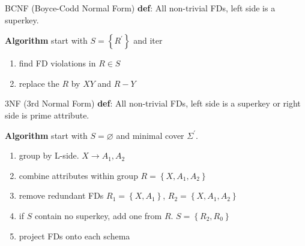 \documentclass[a4paper]{article}
\begin{document}
\begin{cheatsheetblock}{BCNF (Boyce-Codd Normal Form)}
    \textbf{def}: All non-trivial FDs, left side is a superkey.

    \textbf{Algorithm} start with $S = \left\{R^\prime\right\}$ and iter
    \begin{enumerate}
        \item find FD violations in $R \in S$
        \item replace the $R$ by $XY$ and $R-Y$
    \end{enumerate}
\end{cheatsheetblock}

\begin{cheatsheetblock}{3NF (3rd Normal Form)}
    \textbf{def}: All non-trivial FDs, left side is a superkey or right side is prime attribute.

    \textbf{Algorithm} start with $S = \varnothing$ and minimal cover $\Sigma^\prime$.
    \begin{enumerate}
        \item group by L-side. \hfill $X \rightarrow A_1, A_2$
        \item combine attributes within group \hfill $R = \left\{X, A_1, A_2\right\}$
        \item remove redundant FDs \hfill \sout{$R_1 = \left\{X, A_1\right\}$}, $R_2 = \left\{X, A_1, A_2\right\}$
        \item if $S$ contain no superkey, add one from $R$. \hfill $S = \left\{R_2, R_0\right\}$
        \item project FDs onto each schema
    \end{enumerate}
\end{cheatsheetblock}
\end{document}
